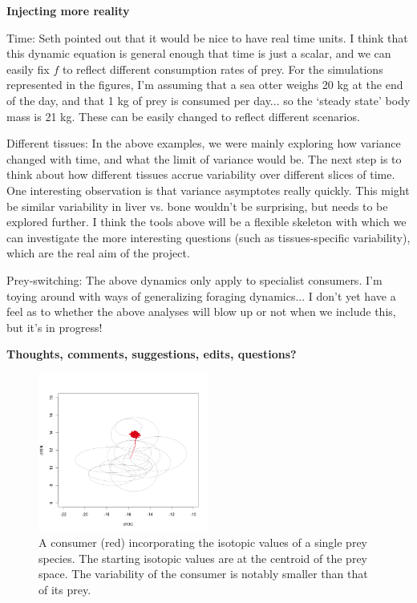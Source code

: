\documentclass[11pt]{article}
\begin{document}
{\bf Injecting more reality} 

Time: Seth pointed out that it would be nice to have real time units.
I think that this dynamic equation is general enough that time is just a scalar, and we can easily fix $f$ to reflect different consumption rates of prey.
For the simulations represented in the figures, I'm assuming that a sea otter weighs 20 kg at the end of the day, and that 1 kg of prey is consumed per day... so the `steady state' body mass is 21 kg.
These can be easily changed to reflect different scenarios.

Different tissues: In the above examples, we were mainly exploring how variance changed with time, and what the limit of variance would be.
The next step is to think about how different tissues accrue variability over different slices of time.
One interesting observation is that variance asymptotes really quickly.
This might be similar variability in liver vs. bone wouldn't be surprising, but needs to be explored further.
I think the tools above will be a flexible skeleton with which we can investigate the more interesting questions (such as tissues-specific variability), which are the real aim of the project.

Prey-switching: The above dynamics only apply to specialist consumers. I'm toying around with ways of generalizing foraging dynamics... I don't yet have a feel as to whether the above analyses will blow up or not when we include this, but it's in progress!

{\bf Thoughts, comments, suggestions, edits, questions?}


\begin{figure}[h!]
   \centering
   \includegraphics[width=0.5\textwidth]{fig_bivariate.png}
      \caption{
      A consumer (red) incorporating the isotopic values of a single prey species. The starting isotopic values are at the centroid of the prey space. The variability of the consumer is notably smaller than that of its prey.
      }
      \label{fig_bivariate}
\end{figure}
\end{document}
